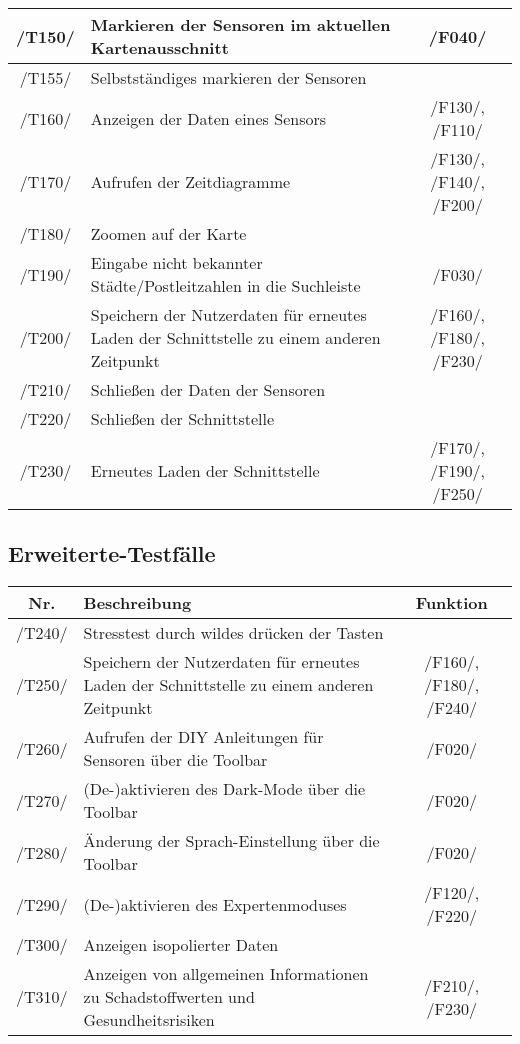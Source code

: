 \begin{tabularx}{\textwidth}{| c | X | c |}
     \hline
     /T150/ & Markieren der Sensoren im aktuellen Kartenausschnitt & /F040/\\
     \hline 
     /T155/ & Selbstständiges markieren der Sensoren & \\
     \hline
     /T160/ & Anzeigen der Daten eines Sensors &  /F130/, /F110/\\
     \hline
     /T170/ & Aufrufen der Zeitdiagramme & /F130/, /F140/, /F200/\\
     \hline
     /T180/ & Zoomen auf der Karte & \\
     \hline
     /T190/ & Eingabe nicht bekannter Städte/Postleitzahlen in die Suchleiste & /F030/\\
     \hline
     /T200/ & Speichern der Nutzerdaten für erneutes Laden der Schnittstelle zu einem anderen Zeitpunkt & /F160/, /F180/, /F230/ \\
     \hline
     /T210/ & Schließen der Daten der Sensoren & \\
     \hline
     /T220/ & Schließen der Schnittstelle & \\
     \hline
     /T230/ & Erneutes Laden der Schnittstelle & /F170/, /F190/, /F250/\\
     \hline
    \end{tabularx}

\subsection{Erweiterte-Testfälle}
\begin{tabularx}{\textwidth}{| c | X | c |}
    \hline
    \textbf{Nr.} & 
    \textbf{Beschreibung} &
    \textbf{Funktion}\\
    \hline 
    /T240/ & Stresstest durch wildes drücken der Tasten & \\
    \hline      
    /T250/ & Speichern der Nutzerdaten für erneutes Laden der Schnittstelle zu einem anderen Zeitpunkt & /F160/, /F180/, /F240/ \\
    \hline  
    /T260/ & Aufrufen der DIY Anleitungen für Sensoren über die Toolbar & /F020/\\
    \hline
    /T270/ & (De-)aktivieren des Dark-Mode über die Toolbar & /F020/\\
    \hline
    /T280/ & Änderung der Sprach-Einstellung über die Toolbar & /F020/\\
    \hline
    /T290/ & (De-)aktivieren des Expertenmoduses & /F120/, /F220/\\
    \hline
    /T300/ & Anzeigen isopolierter Daten & \\
    \hline
    /T310/ & Anzeigen von allgemeinen Informationen zu Schadstoffwerten und Gesundheitsrisiken & /F210/, /F230/ \\
    \hline
\end{tabularx}

